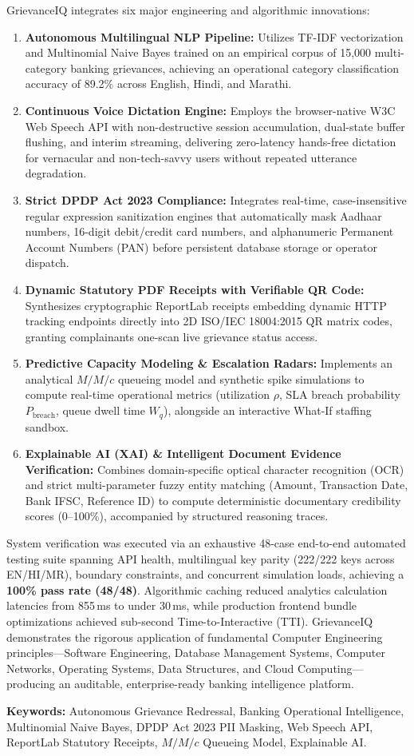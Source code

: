 \vspace{0.4cm}
\noindent GrievanceIQ integrates six major engineering and algorithmic innovations:
\begin{enumerate}
    \item \textbf{Autonomous Multilingual NLP Pipeline:} Utilizes TF-IDF vectorization and Multinomial Naive Bayes trained on an empirical corpus of 15,000 multi-category banking grievances, achieving an operational category classification accuracy of 89.2\% across English, Hindi, and Marathi.
    \item \textbf{Continuous Voice Dictation Engine:} Employs the browser-native W3C Web Speech API with non-destructive session accumulation, dual-state buffer flushing, and interim streaming, delivering zero-latency hands-free dictation for vernacular and non-tech-savvy users without repeated utterance degradation.
    \item \textbf{Strict DPDP Act 2023 Compliance:} Integrates real-time, case-insensitive regular expression sanitization engines that automatically mask Aadhaar numbers, 16-digit debit/credit card numbers, and alphanumeric Permanent Account Numbers (PAN) before persistent database storage or operator dispatch.
    \item \textbf{Dynamic Statutory PDF Receipts with Verifiable QR Code:} Synthesizes cryptographic ReportLab receipts embedding dynamic HTTP tracking endpoints directly into 2D ISO/IEC 18004:2015 QR matrix codes, granting complainants one-scan live grievance status access.
    \item \textbf{Predictive Capacity Modeling \& Escalation Radars:} Implements an analytical $M/M/c$ queueing model and synthetic spike simulations to compute real-time operational metrics (utilization $\rho$, SLA breach probability $P_{\text{breach}}$, queue dwell time $W_q$), alongside an interactive What-If staffing sandbox.
    \item \textbf{Explainable AI (XAI) \& Intelligent Document Evidence Verification:} Combines domain-specific optical character recognition (OCR) and strict multi-parameter fuzzy entity matching (Amount, Transaction Date, Bank IFSC, Reference ID) to compute deterministic documentary credibility scores (0--100\%), accompanied by structured reasoning traces.
\end{enumerate}

\vspace{0.4cm}
\noindent System verification was executed via an exhaustive 48-case end-to-end automated testing suite spanning API health, multilingual key parity (222/222 keys across EN/HI/MR), boundary constraints, and concurrent simulation loads, achieving a \textbf{100\% pass rate (48/48)}. Algorithmic caching reduced analytics calculation latencies from 855\,ms to under 30\,ms, while production frontend bundle optimizations achieved sub-second Time-to-Interactive (TTI). GrievanceIQ demonstrates the rigorous application of fundamental Computer Engineering principles—Software Engineering, Database Management Systems, Computer Networks, Operating Systems, Data Structures, and Cloud Computing—producing an auditable, enterprise-ready banking intelligence platform.

\vspace{0.6cm}
\noindent \textbf{Keywords:} Autonomous Grievance Redressal, Banking Operational Intelligence, Multinomial Naive Bayes, DPDP Act 2023 PII Masking, Web Speech API, ReportLab Statutory Receipts, $M/M/c$ Queueing Model, Explainable AI.
